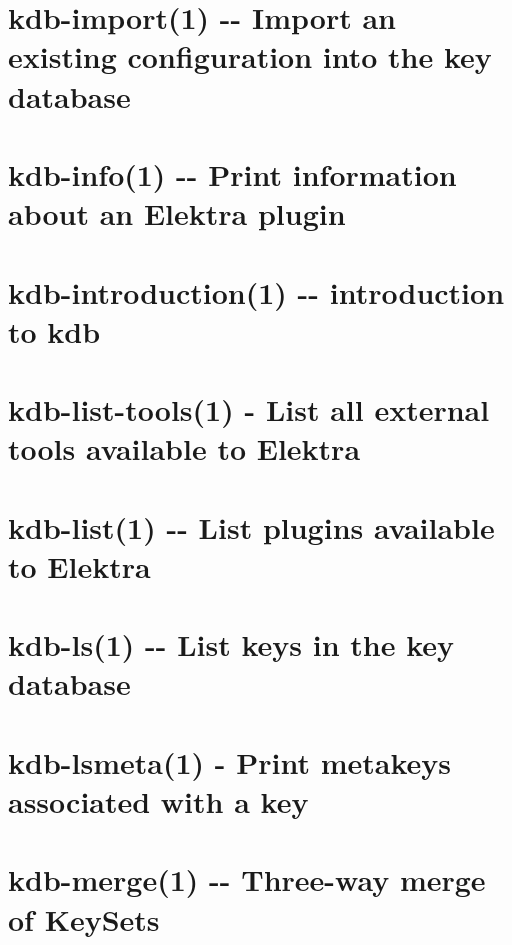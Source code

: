 \documentclass[twoside]{book}
\newcommand{\+}{\discretionary{\mbox{\scriptsize$\hookleftarrow$}}{}{}}
\begin{document}
\chapter{kdb-\/import(1) -\/-\/ Import an existing configuration into the key database}
\label{md_doc_help_kdb-import}
\hypertarget{md_doc_help_kdb-import}{}

\chapter{kdb-\/info(1) -\/-\/ Print information about an Elektra plugin}
\label{md_doc_help_kdb-info}
\hypertarget{md_doc_help_kdb-info}{}

\chapter{kdb-\/introduction(1) -\/-\/ introduction to kdb}
\label{md_doc_help_kdb-introduction}
\hypertarget{md_doc_help_kdb-introduction}{}

\chapter{kdb-\/list-\/tools(1) -\/ List all external tools available to Elektra}
\label{md_doc_help_kdb-list-tools}
\hypertarget{md_doc_help_kdb-list-tools}{}

\chapter{kdb-\/list(1) -\/-\/ List plugins available to Elektra}
\label{md_doc_help_kdb-list}
\hypertarget{md_doc_help_kdb-list}{}

\chapter{kdb-\/ls(1) -\/-\/ List keys in the key database}
\label{md_doc_help_kdb-ls}
\hypertarget{md_doc_help_kdb-ls}{}

\chapter{kdb-\/lsmeta(1) -\/ Print metakeys associated with a key}
\label{md_doc_help_kdb-lsmeta}
\hypertarget{md_doc_help_kdb-lsmeta}{}

\chapter{kdb-\/merge(1) -\/-\/ Three-\/way merge of Key\+Sets}
\label{md_doc_help_kdb-merge}
\hypertarget{md_doc_help_kdb-merge}{}

\end{document}
